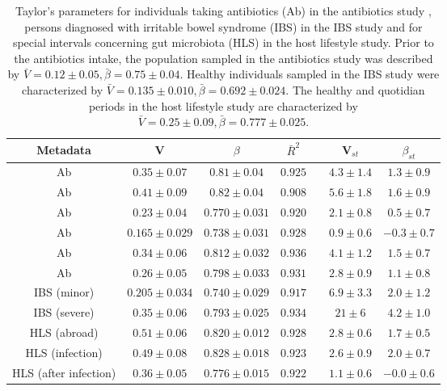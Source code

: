 \documentclass[12pt,oneside,letterpaper]{article}
\begin{document}
\clearpage

\begin{table} 
\caption{Taylor's parameters for individuals taking antibiotics (Ab) in the antibiotics study \cite{antibiotic}, persons diagnosed with irritable bowel syndrome (IBS) in the IBS study \cite{IBS} and for special intervals concerning gut microbiota (HLS) in the host lifestyle study\cite{hostlife}. Prior to the antibiotics intake, the population sampled in the antibiotics study \cite{antibiotic} was described by $\bar{V} = 0.12 \pm 0.05, \bar{\beta} = 0.75 \pm 0.04$. Healthy individuals sampled in the IBS study \cite{IBS} were characterized by $\bar{V} = 0.135 \pm 0.010, \bar{\beta} = 0.692 \pm 0.024$. The healthy and quotidian periods in the host lifestyle study \cite{hostlife} are characterized by $\bar{V} = 0.25 \pm 0.09, \bar{\beta} = 0.777 \pm 0.025$.}

  \begin{center}
    \begin{tabular}{*{7}{c}}
	    \hline
		Metadata&V&$\beta$&$\bar{R}^2$&&V$_{st}$&$\beta_{st}$\\
		\hline
		Ab&$0.35 \pm 0.07$&$0.81 \pm 0.04$&$0.925$&&$4.3 \pm 1.4$&$1.3 \pm 0.9$\\
		Ab&$0.41 \pm 0.09$&$0.82 \pm 0.04$&$0.908$&&$5.6 \pm 1.8$&$1.6 \pm 0.9$\\
		Ab&$0.23 \pm 0.04$&$0.770 \pm 0.031$&$0.920$&&$2.1 \pm 0.8$&$0.5 \pm 0.7$\\
		Ab&$0.165 \pm 0.029$&$0.738 \pm 0.031$&$0.928$&&$0.9 \pm 0.6$&$-0.3 \pm 0.7$\\
		Ab&$0.34 \pm 0.06$&$0.812 \pm 0.032$&$0.936$&&$4.1 \pm 1.2$&$1.5 \pm 0.7$\\
		Ab&$0.26 \pm 0.05$&$0.798 \pm 0.033$&$0.931$&&$2.8 \pm 0.9$&$1.1 \pm 0.8$\\
	    \hline
	 	\hline
		IBS (minor)&$0.205 \pm 0.034$&$0.740 \pm 0.029$&$0.917$&&$6.9 \pm 3.3$&$2.0 \pm 1.2$\\
		IBS (severe)&$0.35 \pm 0.06$&$0.793 \pm 0.025$&$0.934$&&$21 \pm 6$&$4.2 \pm 1.0$\\
        \hline
    	\hline
		HLS (abroad)&$0.51 \pm 0.06$&$0.820 \pm 0.012$&$0.928$&&$2.8 \pm 0.6$&$1.7 \pm 0.5$\\
		HLS (infection)&$0.49 \pm 0.08$&$0.828 \pm 0.018$&$0.923$&&$2.6 \pm 0.9$&$2.0 \pm 0.7$\\
		HLS (after infection)&$0.36 \pm 0.05$&$0.776 \pm 0.015$&$0.922$&&$1.1 \pm 0.6$&$-0.0 \pm 0.6$\\
	    \hline
    	\hline  
    \end{tabular}
  \end{center}
  \label{tab:Ab-IBS-HLS}
\end{table}
\end{document}
